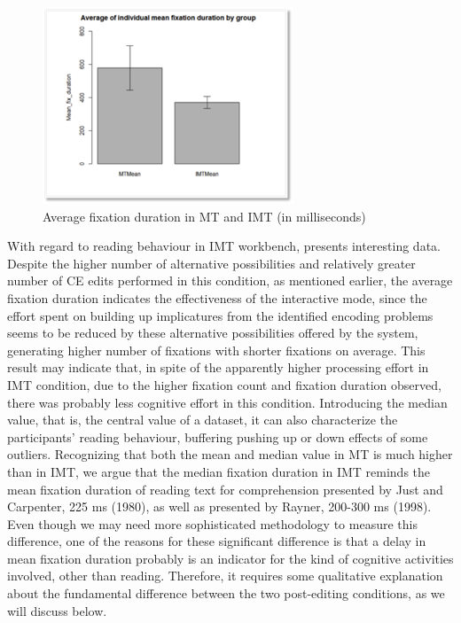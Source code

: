 \documentclass[output=paper]{langsci/langscibook}
\begin{document}
\begin{figure}
 \includegraphics[width=\textwidth]{figures/Sarto7.png}
 \caption{Average fixation duration in MT and IMT (in milliseconds)}
 \label{fig:7}
\end{figure} 


With regard to reading behaviour in IMT workbench,  presents interesting data. Despite the higher number of alternative possibilities and relatively greater number of CE edits performed in this condition, as mentioned earlier, the average fixation duration indicates the effectiveness of the interactive mode, since the effort spent on building up implicatures from the identified encoding problems seems to be reduced by these alternative possibilities offered by the system, generating higher number of fixations with shorter fixations on average. This result may indicate that, in spite of the apparently higher processing effort in IMT condition, due to the higher fixation count and fixation duration observed, there was probably less cognitive effort in this condition. Introducing the median value, that is, the central value of a dataset, it can also characterize the participants’ reading behaviour, buffering pushing up or down effects of some outliers. Recognizing that both the mean and median value in MT is much higher than in IMT, we argue that the median fixation duration in IMT reminds the mean fixation duration of reading text for comprehension presented by Just and Carpenter, 225 ms (1980), as well as presented by Rayner, 200-300 ms (1998). Even though we may need more sophisticated methodology to measure this difference, one of the reasons for these significant difference is that a delay in mean fixation duration probably is an indicator for the kind of cognitive activities involved, other than reading. Therefore, it requires some qualitative explanation about the fundamental difference between the two post-editing conditions, as we will discuss below. 
\end{document}
